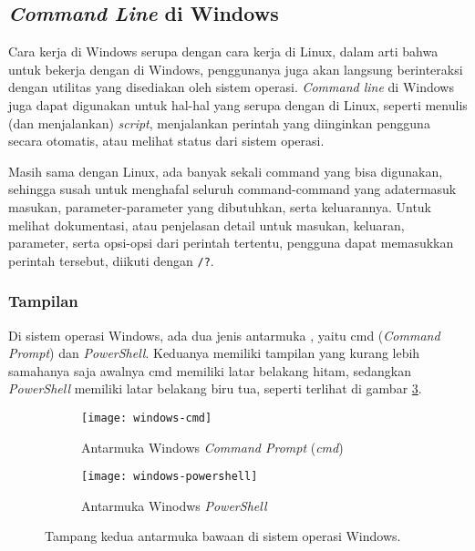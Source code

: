 \subsection{\textit{Command Line} di Windows}
\label{sec:commandline-windows}

Cara kerja \cl di Windows serupa dengan cara kerja \cl di Linux, dalam arti bahwa untuk bekerja dengan \cl di Windows, penggunanya juga akan langsung berinteraksi dengan utilitas yang disediakan oleh sistem operasi. \textit{Command line} di Windows juga dapat digunakan untuk hal-hal yang serupa dengan \cl di Linux, seperti menulis (dan menjalankan) \textit{script}, menjalankan perintah yang diinginkan pengguna secara otomatis, atau melihat status dari sistem operasi.\cite{mueller:2007:windowscommandline}

Masih sama dengan Linux, ada banyak sekali command yang bisa digunakan, sehingga susah untuk menghafal seluruh command-command yang ada\textemdash termasuk masukan, parameter-parameter yang dibutuhkan, serta keluarannya. Untuk melihat dokumentasi, atau penjelasan detail untuk masukan, keluaran, parameter, serta opsi-opsi dari perintah tertentu, pengguna dapat memasukkan perintah tersebut, diikuti dengan \verb|/?|.\cite{mueller:2007:windowscommandline}

\subsubsection{Tampilan}
\label{sec:commandline-windows-appearance}

Di sistem operasi Windows, ada dua jenis antarmuka \cl, yaitu cmd (\textit{Command Prompt}) dan \textit{PowerShell}. Keduanya memiliki tampilan yang kurang lebih sama\textemdash hanya saja awalnya cmd memiliki latar belakang hitam, sedangkan \textit{PowerShell} memiliki latar belakang biru tua, seperti terlihat di gambar \ref{fig:commandline-windows-programs}.

\begin{figure}[ht]
    \begin{subfigure}[b]{0.49\linewidth}
		\centering
		\texttt{[image: windows-cmd]}
		\caption{Antarmuka Windows \textit{Command Prompt} (\textit{cmd})}
		\label{fig:commandline-windows-cmd}
	\end{subfigure}
	\hfill
    \begin{subfigure}[b]{0.49\linewidth}
		\centering
		\texttt{[image: windows-powershell]}
		\caption{Antarmuka Winodws \textit{PowerShell}}
		\label{fig:commandline-windows-powershell}
	\end{subfigure}
    \caption{Tampang kedua antarmuka \cl bawaan di sistem operasi Windows.}
	\label{fig:commandline-windows-programs}
\end{figure}

